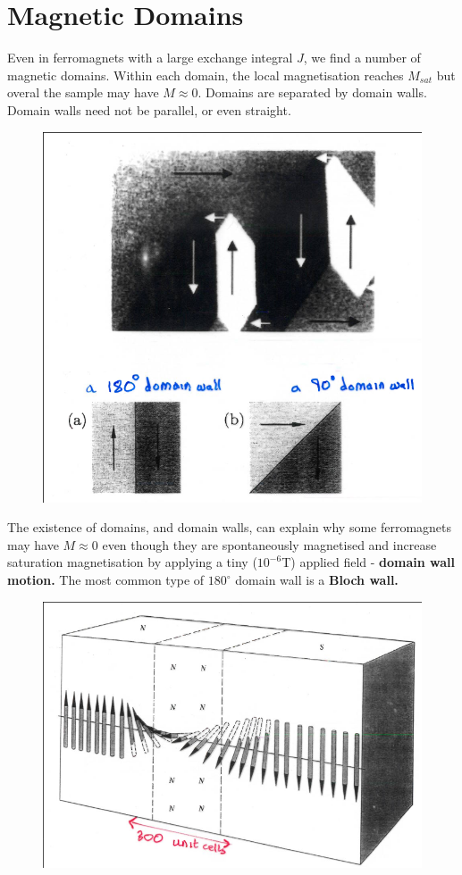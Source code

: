 \documentclass[a4paper, 11pt, normalem]{report}
\begin{document}
\section{Magnetic Domains}
Even in ferromagnets with a large exchange integral $J$, we find a number of magnetic domains. 
Within each domain, the local magnetisation reaches $M_{sat}$ but overal the sample may have $M\approx 0$.
Domains are separated by domain walls.
Domain walls need not be parallel, or even straight.
\begin{figure}[H]
    \centering
    \includegraphics[scale=0.4]{domain.png}
\end{figure}
The existence of domains, and domain walls, can explain why some ferromagnets may have $M\approx 0$ even though they are spontaneously magnetised and increase saturation magnetisation by applying a tiny ($10^{-6}$T) applied field - \textbf{domain wall motion.}
The most common type of $180^\circ$ domain wall is a \textbf{Bloch wall.}
\begin{figure}[H]
    \centering
    \includegraphics[scale=0.5]{blochwall.png}
\end{figure}
\end{document}
